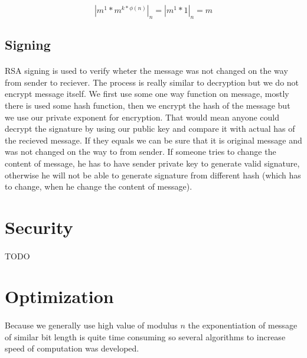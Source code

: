 \documentclass[thesis=B,english]{FITthesis}[2012/10/20]
\begin{document}
{{\[| m^1 * m^{ k*\phi(n)}|_n = | m^1 * 1|_n =  m\]}

\subsection{Signing}
\paragraph*{}{
RSA signing is used to verify wheter the message was not changed on the way from sender to reciever. The process is really similar to decryption but we do not encrypt message itself. We first use some one way function on message, mostly there is used some hash function, then we encrypt the hash of the message but we use our private exponent for encryption. That would mean anyone could decrypt the signature by using our public key and compare it with actual has of the recieved message. If they equals we can be sure that it is original message and was not changed on the way to from sender. If someone tries to change the content of message, he has to have sender private key to generate valid signature, otherwise he will not be able to generate signature from different hash (which has to change, when he change the content of message).

}
\section{Security}

\paragraph*{}{
TODO
}

\section{Optimization}
\paragraph*{}
{Because we generally use high value of modulus \(n\) the exponentiation of message of similar bit length is quite time consuming so several algorithms to increase speed of computation was developed.}

}
\end{document}
